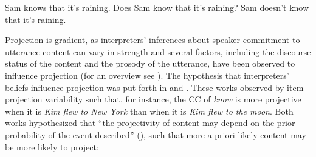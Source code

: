 \documentclass[11pt,fleqn]{article}
\newcommand{\6}{\mbox{$[\hspace*{-.6mm}[$}}
\newcommand{\9}{\mbox{$]\hspace*{-.6mm}]$}}
\begin{document}
\begin{exe}
\ex\label{know}
\begin{xlist}
\ex\label{ass} Sam knows that it's raining.
\ex\label{pq} Does Sam know that it's raining?
\ex\label{neg} Sam doesn't know that it's raining.
\end{xlist}
\end{exe}

%
%
%
%
%
%
%

Projection is gradient, as interpreters' inferences about speaker commitment to utterance content can vary in strength and several factors, including the discourse status of the content and the prosody of the utterance, have been observed to influence projection (for an overview see \citealt{tbd-variability}). The hypothesis that interpreters' beliefs influence projection was put forth in \citealt*{stevens-etal2017} and \citealt*{tbd-variability}. These works observed by-item projection variability such that, for instance, the CC of {\em know} is more projective when it is {\em Kim flew to New York} than when it is {\em Kim flew to the moon}. Both works hypothesized that ``the projectivity of content may depend on the prior probability of the event described'' (\citealt[500]{tbd-variability}), such that more a priori likely content may be more likely to project: 
\end{document}
